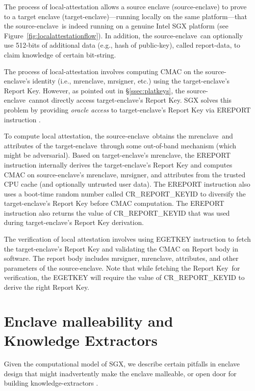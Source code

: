 \documentclass[letterpaper]{article}
\newcommand{\secref}[1]{\S\ref{#1}}
\newcommand{\mrenclave}{\textsf{mrenclave}}
\newcommand{\mrsigner}{\textsf{mrsigner}}
\newcommand{\se}{source-enclave}
\newcommand{\te}{target-enclave}
\newcommand{\rk}{\textsf{Report Key}}
\begin{document}
  The process of local-attestation allows a source enclave (\se) to
  prove to a target enclave (\te)---running locally on the same
  platform---that the \se\ is indeed running on a genuine Intel SGX
  platform (see Figure~\ref{fig:localattestationflow}). In addition,
  the \se\ can optionally use 512-bits of additional data (e.g., hash
  of public-key), called report-data, to claim knowledge of certain
  bit-string.

  The process of local-attestation involves computing CMAC
  \cite{aescmac} on the \se's identity (i.e., \mrenclave, \mrsigner,
  etc.) using the \te's Report Key. However, as pointed out in
  \secref{ssec:platkeys}, the \se\ cannot directly access \te's Report
  Key. SGX solves this problem by providing \textit{oracle access} to
  \te's Report Key via \textsf{EREPORT} instruction
  \cite[\S14.4.1]{intelsdm}.
  
  To compute local attestation, the \se\ obtains the \mrenclave\ and
  attributes of the \te\ through some out-of-band mechanism (which
  might be adversarial). Based on \te's \mrenclave, the
  \textsf{EREPORT} instruction internally derives the \te's Report Key
  and computes \textsf{CMAC} on \se's \mrenclave, \mrsigner, and
  attributes from the trusted CPU cache (and optionally untrusted user
  data).  The \textsf{EREPORT} instruction also uses a boot-time
  random number called \textsf{CR\_REPORT\_KEYID} to diversify the
  \te's Report Key before \textsf{CMAC} computation. The
  \textsf{EREPORT} instruction also returns the value of
  \textsf{CR\_REPORT\_KEYID} that was used during \te's Report Key
  derivation.

  The verification of local attestation involves using
  \textsf{EGETKEY} instruction to fetch the \te's Report Key and
  validating the \textsf{CMAC} on Report body in software.  The report
  body includes \mrsigner, \mrenclave, attributes, and other
  parameters of the \se. Note that while fetching the \rk\ for
  verification, the \textsf{EGETKEY} will require the value of
  \textsf{CR\_REPORT\_KEYID} to derive the right \rk.

  \section{Enclave malleability and Knowledge Extractors}
  \label{sec:analysisfwk}

  Given the computational model of SGX, we describe certain pitfalls
  in enclave design that might inadvertently make the enclave
  malleable, or open door for building knowledge-extractors
  \cite{BellarePOK}.
\end{document}
